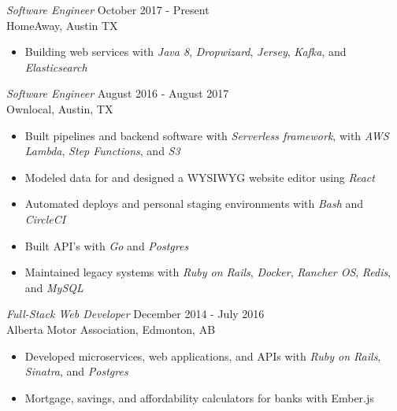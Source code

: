 \documentclass[margin, 10pt]{res} %
\begin{document}
\begin{resume}
{\sl Software Engineer} \hfill October 2017 - Present \\
HomeAway, Austin TX
\begin{itemize}
    \item Building web services with {\it Java 8}, {\it Dropwizard}, {\it Jersey}, {\it Kafka}, and {\it Elasticsearch}
\end{itemize}


{\sl Software Engineer } \hfill August 2016 - August 2017 \\
Ownlocal, Austin, TX
\begin{itemize}
    \item Built pipelines and backend software with {\it Serverless framework}, with {\it AWS Lambda}, {\it Step Functions}, and {\it S3}
    \item Modeled data for and designed a WYSIWYG website editor using {\it React}
    \item Automated deploys and personal staging environments with {\it Bash} and {\it CircleCI}
    \item Built API's with {\it Go} and {\it Postgres}
    \item Maintained legacy systems with {\it Ruby on Rails}, {\it Docker}, {\it Rancher OS}, {\it Redis}, and {\it MySQL}
\end{itemize}

{\sl Full-Stack Web Developer} \hfill December 2014 - July 2016 \\
Alberta Motor Association, Edmonton, AB
\begin{itemize} 
    \item Developed microservices, web applications, and APIs with {\it Ruby on Rails}, {\it Sinatra}, and {\it Postgres}
    \item Mortgage, savings, and affordability calculators for banks with Ember.js
\end{itemize}





\end{resume}
\end{document}
